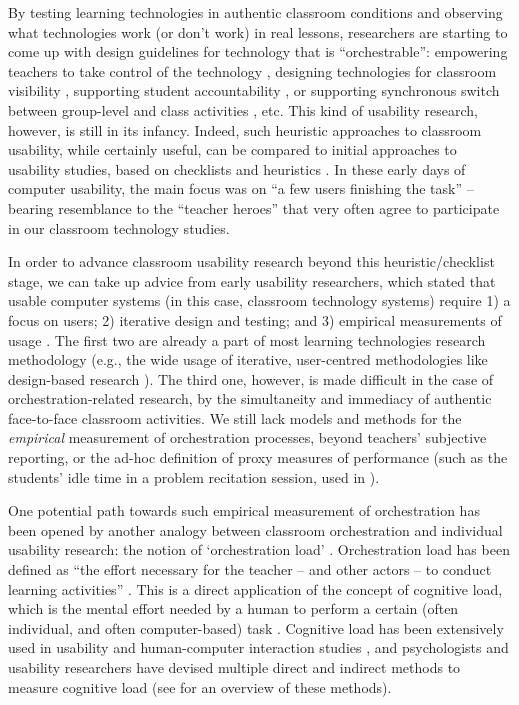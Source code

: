 \documentclass[10pt,journal,compsoc]{IEEEtran}
\begin{document}
By testing learning technologies in authentic classroom conditions and observing what technologies work (or don't work) in real lessons, researchers are starting to come up with design guidelines for technology that is ``orchestrable'': empowering teachers to take control of the technology \cite{Cuendet2013}, designing technologies for classroom visibility \cite{Dillenbourg2013}, supporting student accountability \cite{Kharrufa2013}, or supporting synchronous switch between group-level and class activities \cite{Kreitmayer2013}, etc. This kind of usability research, however, is still in its infancy. Indeed, such heuristic approaches to classroom usability, while certainly useful, can be compared to initial approaches to usability studies, based on checklists \cite{ravden1989evaluating} and heuristics \cite{nielsen1992finding}. In these early days of computer usability, the main focus was on ``a few users finishing the task'' \cite{Webusability} -- bearing resemblance to the ``teacher heroes'' \cite{Dillenbourg2009b} that very often agree to participate in our classroom technology studies. 

In order to advance classroom usability research beyond this heuristic/checklist stage, we can take up advice from early usability researchers, which stated that usable computer systems (in this case, classroom technology systems) require 1) a focus on users; 2) iterative design and testing; and 3) empirical measurements of usage \cite{Gould1985}. The first two are already a part of most learning technologies research methodology (e.g., the wide usage of iterative, user-centred methodologies like design-based research \cite{wang2005design}). The third one, however, is made difficult in the case of orchestration-related research, by the simultaneity and immediacy of authentic face-to-face classroom activities. We still lack models and methods for the \textit{empirical} measurement of orchestration processes, beyond teachers' subjective reporting, or the ad-hoc definition of proxy measures of performance (such as the students' idle time in a problem recitation session, used in \cite{Alavi2012}).

One potential path towards such empirical measurement of orchestration has been opened by another analogy between classroom orchestration and individual usability research: the notion of `orchestration load' \cite{Dillenbourg2013}. Orchestration load has been defined as ``the effort necessary for the teacher -- and other actors -- to conduct learning activities'' \cite{Cuendet2013}. This is a direct application of the concept of cognitive load, which is the mental effort needed by a human to perform a certain (often individual, and often computer-based) task \cite{Paas2004}. Cognitive load has been extensively used in usability and human-computer interaction studies \cite{oviatt2004we}, and psychologists and usability researchers have devised multiple direct and indirect methods to measure cognitive load (see \cite{Brunken2003} for an overview of these methods). 
\end{document}

